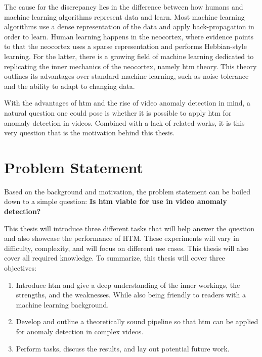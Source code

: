 \par
The cause for the discrepancy lies in the difference between how humans and machine learning algorithms represent data and learn. Most machine learning algorithms use a dense representation of the data and apply back-propagation in order to learn. Human learning happens in the neocortex, where evidence points to that the neocortex uses a sparse representation and performs Hebbian-style learning. For the latter, there is a growing field of machine learning dedicated to replicating the inner mechanics of the neocortex, namely  \gls*{htm} theory. This theory outlines its advantages over standard machine learning, such as noise-tolerance and the ability to adapt to changing data.
\par
With the advantages of  \gls*{htm} and the rise of video anomaly detection in mind, a natural question one could pose is whether it is possible to apply  \gls*{htm} for anomaly detection in videos. Combined with a lack of related works, it is this very question that is the motivation behind this thesis.
\section{Problem Statement}
Based on the background and motivation, the problem statement can be boiled down to a simple question: \textbf{Is \gls*{htm} viable for use in video anomaly detection?}\par
This thesis will introduce three different tasks that will help answer the question and also showcase the performance of HTM. These experiments will vary in difficulty, complexity, and will focus on different use cases. This thesis will also cover all required knowledge. To summarize, this thesis will cover three objectives:
\begin{enumerate}
    \item Introduce  \gls*{htm} and give a deep understanding of the inner workings, the strengths, and the weaknesses. While also being friendly to readers with a machine learning background.
    \item Develop and outline a theoretically sound pipeline so that  \gls*{htm} can be applied for anomaly detection in complex videos.
    \item Perform tasks, discuss the results, and lay out potential future work.
\end{enumerate}
